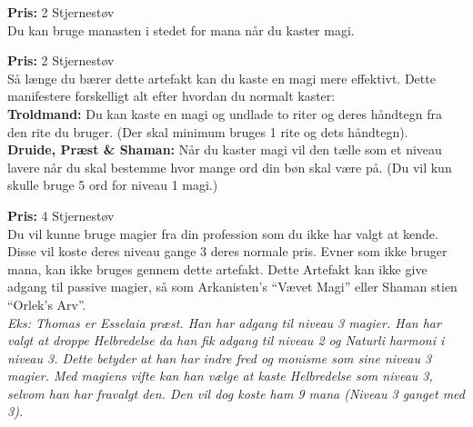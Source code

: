 \begin{artefakt*}
\textbf{Pris:} 2 Stjernestøv\\
Du kan bruge manasten i stedet for mana når du kaster magi.
\end{artefakt*} 

\begin{artefakt*}
\textbf{Pris:} 2 Stjernestøv\\
Så længe du bærer dette artefakt kan du kaste en magi mere effektivt. Dette manifestere forskelligt alt efter hvordan du normalt kaster:\\
\textbf{Troldmand:}  Du kan kaste en magi og undlade to riter og deres håndtegn fra den rite du bruger. (Der skal minimum bruges 1 rite og dets håndtegn).\\
\textbf{Druide, Præst \& Shaman:} Når du kaster magi vil den tælle som et niveau lavere når du skal bestemme hvor mange ord din bøn skal være på. (Du vil kun skulle bruge 5 ord for niveau 1 magi.)\\
\end{artefakt*}

\begin{artefakt*}
\textbf{Pris:} 4 Stjernestøv\\
Du vil kunne bruge magier fra din profession som du ikke har valgt at kende. Disse vil koste deres niveau gange 3 deres normale pris. Evner som ikke bruger mana, kan ikke bruges gennem dette artefakt. Dette Artefakt kan ikke give adgang til passive magier, så som Arkanisten’s “Vævet Magi” eller Shaman stien “Orlek’s Arv”.\\
\textit{Eks: Thomas er Esselaia præst. Han har adgang til niveau 3 magier. Han har valgt at droppe Helbredelse da han fik adgang til niveau 2 og Naturli harmoni i niveau 3. Dette betyder at han har indre fred og monisme som sine niveau 3 magier. Med magiens vifte kan han vælge at kaste Helbredelse som niveau 3, selvom han har fravalgt den.  Den vil dog koste ham 9 mana (Niveau 3 ganget med 3). }
\end{artefakt*}